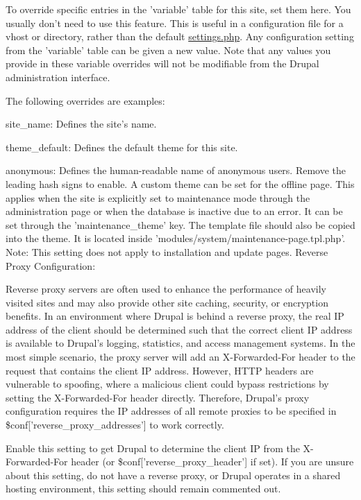 To override specific entries in the 'variable' table for this site, set them here. You usually don't need to use this feature. This is useful in a configuration file for a vhost or directory, rather than the default \hyperlink{settings_8php}{settings.php}. Any configuration setting from the 'variable' table can be given a new value. Note that any values you provide in these variable overrides will not be modifiable from the Drupal administration interface.

The following overrides are examples:
\begin{DoxyItemize}
\item site\_\-name: Defines the site's name.
\item theme\_\-default: Defines the default theme for this site.
\item anonymous: Defines the human-\/readable name of anonymous users. Remove the leading hash signs to enable. A custom theme can be set for the offline page. This applies when the site is explicitly set to maintenance mode through the administration page or when the database is inactive due to an error. It can be set through the 'maintenance\_\-theme' key. The template file should also be copied into the theme. It is located inside 'modules/system/maintenance-\/page.tpl.php'. Note: This setting does not apply to installation and update pages. Reverse Proxy Configuration:
\end{DoxyItemize}

Reverse proxy servers are often used to enhance the performance of heavily visited sites and may also provide other site caching, security, or encryption benefits. In an environment where Drupal is behind a reverse proxy, the real IP address of the client should be determined such that the correct client IP address is available to Drupal's logging, statistics, and access management systems. In the most simple scenario, the proxy server will add an X-\/Forwarded-\/For header to the request that contains the client IP address. However, HTTP headers are vulnerable to spoofing, where a malicious client could bypass restrictions by setting the X-\/Forwarded-\/For header directly. Therefore, Drupal's proxy configuration requires the IP addresses of all remote proxies to be specified in \$conf\mbox{[}'reverse\_\-proxy\_\-addresses'\mbox{]} to work correctly.

Enable this setting to get Drupal to determine the client IP from the X-\/Forwarded-\/For header (or \$conf\mbox{[}'reverse\_\-proxy\_\-header'\mbox{]} if set). If you are unsure about this setting, do not have a reverse proxy, or Drupal operates in a shared hosting environment, this setting should remain commented out.

